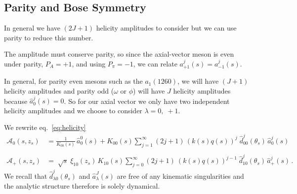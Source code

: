 \documentclass[10pt, aps,prd,amsmath,amssymb,superscriptaddress,onecolumn,
nofootinbib,showpacs,preprintnumbers]{revtex4-1}
\begin{document}
\subsection{Parity and Bose Symmetry}
In general we have \((2J+1)\) helicity amplitudes to consider but we can use parity to reduce this number.

The amplitude must conserve parity, so since the axial-vector meson is even under parity, \( P_A = +1\), and using \(P_\pi = -1\), we can relate \(a_{+1}^j(s) = a_{-1}^j(s)\).

In general, for parity even mesons such as the \(a_1(1260)\), we will have \((J +1)\) helicity amplitudes and parity odd (\(\omega \text{ or } \phi\)) will have \(J\) helicity amplitudes because \(\hat{a}^j_0(s) = 0\). So for our axial vector we only have two independent helicity amplitudes and we choose to consider \(\lambda = 0,\; +1\).

We rewrite eq.~\ref{eq:helicity}
  \begin{align}
    \label{eq:model-helicity-zero}
    \mathcal{A}_0(s,z_s) &= \frac{1}{K_{00}(s)} \, \hat{a}^0_0(s) + K_{00}(s) \sum_{j = 1}^\infty (2j+1) \, (k(s)q(s))^j \; \hat{d}_{00}^j(\theta_s) \, \hat{a}^j_0(s) \\
    \nonumber \\
    \label{eq:model-helicity-plus}
    \mathcal{A}_+(s,z_s) &= \; \sqrt{s} \; \xi_{10}(z_s) \, K_{10}(s) \sum_{j = 0}^\infty (2j+1) \ (k(s)q(s))^{j-1} \;  \hat{d}_{10}^j(\theta_s) \, \hat{a}^j_+(s) \,.
   \end{align}
We recall that \(\hat{d}^j_{\lambda 0}(\theta_s)\) and \(\hat{a}_\lambda^J(s)\) are free of any kinematic singularities and the analytic structure therefore is solely dynamical.
\end{document}
